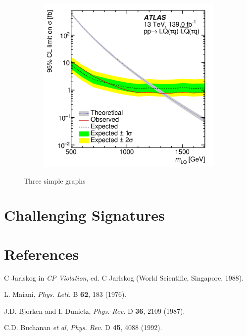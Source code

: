 \documentclass{moriond}
\def\Journal#1#2#3#4{{#1} {\bf #2}, #3 (#4)}
\def\PLB{{\em Phys. Lett.}  B}
\def\PRD{{\em Phys. Rev.} D}
\begin{document}
\begin{figure}[htbp!]
\begin{subfigure}[b]{0.32\textwidth}
         \caption{}
         \label{fig:micro}
     \end{subfigure}
     \begin{subfigure}[b]{0.32\textwidth}
         \centering
         \includegraphics[width=\textwidth]{excited}
         \caption{}
         \label{fig:excited}
     \end{subfigure}
        \caption{Three simple graphs}
        \label{fig:limits2}
\end{figure}

\section{Challenging Signatures}

\section*{References}

\begin{thebibliography}{99}
C Jarlskog in {\em CP Violation}, ed. C Jarlskog
(World Scientific, Singapore, 1988).

L. Maiani, \Journal{\PLB}{62}{183}{1976}.

J.D. Bjorken and I. Dunietz, \Journal{\PRD}{36}{2109}{1987}.

C.D. Buchanan {\it et al}, \Journal{\PRD}{45}{4088}{1992}.

\end{thebibliography}
\end{document}
